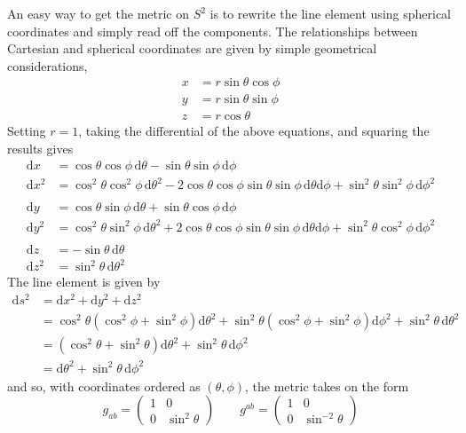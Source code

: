 \documentclass[../road-to-reality.tex]{subfiles}
\begin{document}
\begin{questions}
\begin{solution}
		An easy way to get the metric on $S^2$ is to rewrite the line element using spherical coordinates and simply read off the components. The relationships between Cartesian and spherical coordinates are given by simple geometrical considerations,
		\begin{align*}
			x &= r\sin\theta\cos\phi \\
			y &= r\sin\theta\sin\phi \\
			z &= r\cos\theta
		\end{align*} 
		Setting $r=1$, taking the differential of the above equations, and squaring the results gives
		\begin{align*}
			\mathrm{d}x &= \cos\theta\cos\phi\,\mathrm{d}\theta - \sin\theta\sin\phi\,\mathrm{d}\phi \\
			\mathrm{d}x^2 &= \cos^2\theta\cos^2\phi\,\mathrm{d}\theta^2 - 2\cos\theta\cos\phi\sin\theta\sin\phi\,\mathrm{d}\theta\mathrm{d}\phi + \sin^2\theta\sin^2\phi\,\mathrm{d}\phi^2 \\ \\
			\mathrm{d}y &= \cos\theta\sin\phi\,\mathrm{d}\theta + \sin\theta\cos\phi\,\mathrm{d}\phi \\
			\mathrm{d}y^2 &= \cos^2\theta\sin^2\phi\,\mathrm{d}\theta^2 + 2\cos\theta\cos\phi\sin\theta\sin\phi\,\mathrm{d}\theta\mathrm{d}\phi + \sin^2\theta\cos^2\phi\,\mathrm{d}\phi^2 \\ \\
			\mathrm{d}z &= -\sin\theta\,\mathrm{d}\theta \\
			\mathrm{d}z^2 &= \sin^2\theta\,\mathrm{d}\theta^2
		\end{align*}
		The line element is given by
		\begin{align*}
			\mathrm{d}s^2 &= \mathrm{d}x^2 + \mathrm{d}y^2 + \mathrm{d}z^2 \\
			&= \cos^2\theta(\cos^2\phi + \sin^2\phi)\mathrm{d}\theta^2 + \sin^2\theta(\cos^2\phi + \sin^2\phi)\mathrm{d}\phi^2 + \sin^2\theta\,\mathrm{d}\theta^2 \\
			&= (\cos^2\theta + \sin^2\theta)\mathrm{d}\theta^2 + \sin^2\theta\,\mathrm{d}\phi^2 \\
			&= \mathrm{d}\theta^2 + \sin^2\theta\,\mathrm{d}\phi^2
		\end{align*}
		and so, with coordinates ordered as $(\theta, \phi)$, the metric takes on the form
		\[
			g_{ab} = \begin{pmatrix}1 & 0 \\ 0 & \sin^2\theta\end{pmatrix} \qquad g^{ab} = \begin{pmatrix}1 & 0 \\ 0 & \sin^{-2}\theta\end{pmatrix}
\]
\end{solution}
\end{questions}
\end{document}

